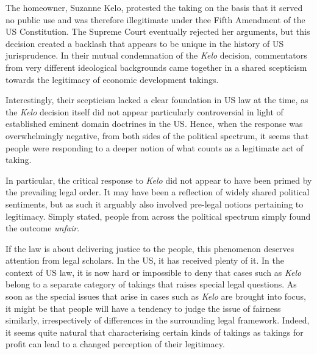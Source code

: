 The homeowner, Suzanne Kelo, protested the taking on the basis that it served no public use and was therefore illegitimate under thee Fifth Amendment of the US Constitution. The Supreme Court eventually rejected her arguments, but this decision created a backlash that appears to be unique in the history of US jurisprudence. In their mutual condemnation of the {\it Kelo} decision, commentators from very different ideological backgrounds came together in a shared scepticism towards the legitimacy of economic development takings.

Interestingly, their scepticism lacked a clear foundation in US law at the time, as the {\it Kelo} decision itself did not appear particularly controversial in light of established eminent domain doctrines in the US. Hence, when the response was overwhelmingly negative, from both sides of the political spectrum, it seems that people were responding to a deeper notion of what counts as a legitimate act of taking.

In particular, the critical response to {\it Kelo} did not appear to have been primed by the prevailing legal order. It may have been a reflection of widely shared political sentiments, but as such it arguably also involved pre-legal notions pertaining to legitimacy. Simply stated, people from across the political spectrum simply found the outcome {\it unfair}.

If the law is about delivering justice to the people, this phenomenon deserves attention from legal scholars. In the US, it has received plenty of it. In the context of US law, it is now hard or impossible to deny that cases such as {\it Kelo} belong to a separate category of takings that raises special legal questions. 
As soon as the special issues that arise in cases such as {\it Kelo} are brought into focus, it might be that people will have a tendency to judge the issue of fairness similarly, irrespectively of differences in the surrounding legal framework. Indeed, it seems quite natural that characterising certain kinds of takings as takings for profit can lead to a changed perception of their legitimacy.

